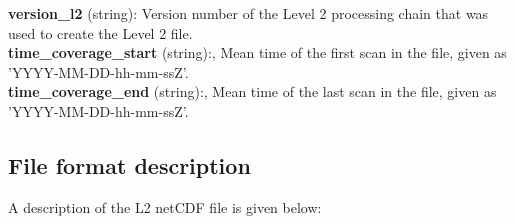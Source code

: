 \textbf{version\_l2} (string): Version number of the Level 2 processing chain that was used to create the Level 2 file. \\

\textbf{time\_coverage\_start} (string):, Mean time of the first scan in the file, given as 'YYYY-MM-DD-hh-mm-ssZ'. \\
                
\textbf{time\_coverage\_end} (string):, Mean time of the last scan in the file, given as 'YYYY-MM-DD-hh-mm-ssZ'. \\


\subsection{File format description}

A description of the L2 netCDF file is given below:

